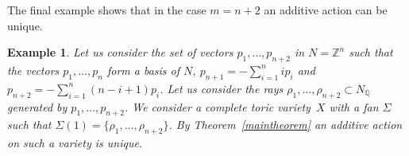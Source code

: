 \documentclass[a4paper,reqno,12pt]{amsart}
\def\Z  {\mathbb Z}
\def\Q  {\mathbb Q}
\newtheorem{example}{Example}
\theoremstyle{definition}
\begin{document}
  The final example shows that in the case $m=n+2$ an additive action can be unique.
\begin{example}
  Let us consider the set of vectors $p_1, \ldots, p_{n+2}$ in $N=\Z^n$
  such that the vectors $p_1, \ldots, p_n$ form a basis of $N$, ${p_{n+1}=-\sum_{i=1}^nip_i}$ and ${p_{n+2}=-\sum_{i=1}^n(n-i+1)p_i}$.
  Let us consider the rays $\rho_1, \ldots, \rho_{n+2} \subset N_{\Q}$ generated by $p_1, \ldots, p_{n+2}$.
  We consider a complete toric variety~$X$ with a fan $\Sigma$ such that $\Sigma(1) = \{\rho_1, \ldots, \rho_{n+2}\}$.
  By Theorem~\ref{maintheorem} an additive action on such a variety is unique.
\end{example}

\smallskip


\begin{thebibliography}{99}


\end{thebibliography}
\end{document}
